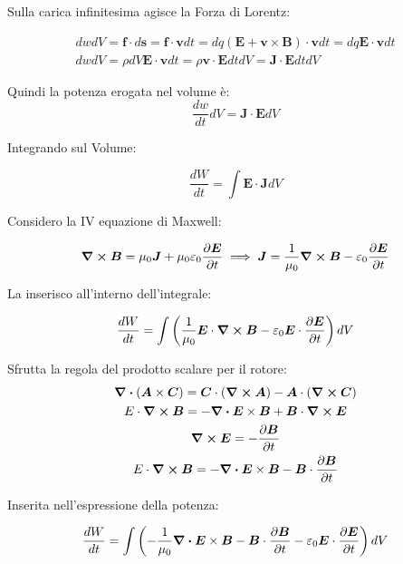 \documentclass[a4paper]{scrarticle}
\begin{document}
Sulla carica infinitesima agisce la Forza di Lorentz:

\begin{gather*}
    dw dV = \bm f \cdot d\bm s = \bm f \cdot \bm v dt = dq (\bm E + \bm v\times \bm B )\cdot \bm v dt = dq \bm E \cdot \bm v dt\\
    dw dV = \rho dV \bm E \cdot \bm v dt = \rho \bm v \cdot \bm E dtdV = \bm J \cdot \bm E dtdV
\end{gather*}

Quindi la potenza erogata nel volume è:
\begin{equation}
    \frac{dw}{dt}dV = \bm J \cdot \bm E dV
\end{equation}

Integrando sul Volume:

\begin{equation*}
    \frac{dW}{dt}= \int \bm E \cdot \bm J dV
\end{equation*}

Considero la IV equazione di Maxwell:

\begin{equation*}
    \curl {\bm B} = \mu_0 \bm J + \mu_0\varepsilon_0 \pdv{\bm E}{t} \implies \bm J = \frac{1}{\mu_0} \curl {\bm B} - \varepsilon_0 \pdv{\bm E}{t}
\end{equation*}

La inserisco all'interno dell'integrale:

\begin{equation*}
    \frac{dW}{dt} = \int \left(\frac{1}{\mu_0} \bm E \cdot \curl{\bm B} - \varepsilon_0 \bm E \cdot \pdv{\bm E}{t} \right) dV
\end{equation*}

Sfrutta la regola del prodotto scalare per il rotore:
\begin{gather*}
    \div (\bm A \times \bm C) = \bm C \cdot (\curl{\bm A}) - \bm A \cdot (\curl{\bm C})\\
    E \cdot \curl{\bm B} = - \div{\bm E \times \bm B} + \bm B \cdot \curl{\bm E}\\
    \curl{\bm E} = - \pdv{\bm B}{t}\\
    E \cdot \curl{\bm B} = - \div{\bm E \times \bm B} - \bm B \cdot \pdv{\bm B}{t}
\end{gather*}

Inserita nell'espressione della potenza:

\begin{equation*}
    \frac{dW}{dt} = \int \left(- \frac{1}{\mu_0}\div{\bm E \times \bm B} - \bm B \cdot \pdv{\bm B}{t} - \varepsilon_0 \bm E \cdot \pdv{\bm E}{t}\right)dV
\end{equation*}
\end{document}
